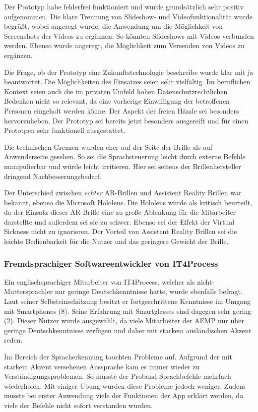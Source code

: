 Der Prototyp habe fehlerfrei funktioniert und wurde grundsätzlich sehr positiv aufgenommen. Die klare Trennung von Slideshow- und Videofunktionalität wurde begrüßt, wobei angeregt wurde, die Anwendung um die Möglichkeit von Screenshots der Videos zu ergänzen. So könnten Slideshows mit Videos verbunden werden. Ebenso wurde angeregt, die Möglichkeit zum Versenden von Videos zu ergänzen.

Die Frage, ob der Prototyp eine Zukunftstechnologie beschreibe wurde klar mit ja beantwortet. Die Möglichkeiten des Einsatzes seien sehr vielfältig. Im beruflichen Kontext seien auch die im privaten Umfeld hohen Datenschutzrechtlichen Bedenken nicht so relevant, da eine vorherige Einwilligung der betroffenen Personen eingeholt werden könne. Der Aspekt der freien Hände sei besonders hervorzuheben. Der Prototyp sei bereits jetzt besonders ausgereift und für einen Prototpen sehr funktionell ausgestattet.

Die technischen Grenzen wurden eher auf der Seite der Brille als auf Anwenderseite gesehen. So sei die Sprachsteuerung leicht durch externe Befehle manipulierbar und würde leicht irritieren. Hier sei seitens der Brillenhersteller dringend Nachbesserungsbedarf. 

Der Unterschied zwischen \emph{echter} AR-Brillen und Assistent Reality Brillen war bekannt, ebenso die Microsoft Hololens. Die Hololens wurde als kritisch beurteilt, da der Einsatz dieser AR-Brille eine zu große Ablenkung für die Mitarbeiter darstellte und außerdem sei sie zu schwer. Ebenso sei der Effekt der Virtual Sickness nicht zu ignorieren. Der Vorteil von Assistent Reality Brillen sei die leichte Bedienbarkeit für die Nutzer und das geringere Gewicht der Brille.
%
%
\subsubsection{Fremdsprachiger Softwareentwickler von IT4Process}
%
Ein englischsprachiger Mitarbeiter von IT4Process, welcher als nicht-Muttersprachler nur geringe Deutschkenntnisse hatte, wurde ebenfalls befragt. Laut seiner Selbsteinschätzung besitzt er fortgeschrittene Kenntnisse im Umgang mit Smartphones (8). Seine Erfahrung mit Smartglasses sind dagegen sehr gering (2). Dieser Nutzer wurde ausgewählt, da viele Mitarbeiter der AEMP nur über geringe Deutschkenntnisse verfügen und daher mit starkem ausländischen Akzent reden.

Im Bereich der Spracherkennung tauchten Probleme auf. Aufgrund der mit starkem Akzent versehenen Aussprache kam es immer wieder zu Verständigungsproblemen. So musste der Proband Sprachbefehle mehrfach wiederholen. Mit einiger Übung wurden diese Probleme jedoch weniger. Zudem musste bei erster Anwendung viele der Funktionen der App erklärt werden, da viele der Befehle nicht sofort verstanden wurden.

